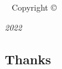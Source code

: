 \mainmatter
\maketitle


\newpage
\begin{fullwidth}
~\vfill
\thispagestyle{empty}
\setlength{\parindent}{0pt}
\setlength{\parskip}{\baselineskip}
Copyright \copyright\ \the\year\ \thanklessauthor


\par{}

\par\textit{2022}
\end{fullwidth}

\tableofcontents





\subsection*{Thanks}

